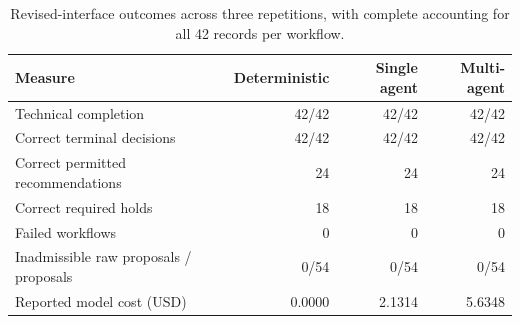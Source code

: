 \begin{table}[htbp]
\centering
\caption{Revised-interface outcomes across three repetitions, with complete accounting for all 42 records per workflow.}
\label{tab:narrative-interface}
\small
\begin{tabular*}{\textwidth}{@{\extracolsep{\fill}}lrrr@{}}
\toprule
Measure & Deterministic & Single agent & Multi-agent \\
\midrule
Technical completion & 42/42 & 42/42 & 42/42 \\
Correct terminal decisions & 42/42 & 42/42 & 42/42 \\
Correct permitted recommendations & 24 & 24 & 24 \\
Correct required holds & 18 & 18 & 18 \\
Failed workflows & 0 & 0 & 0 \\
Inadmissible raw proposals / proposals & 0/54 & 0/54 & 0/54 \\
Reported model cost (USD) & 0.0000 & 2.1314 & 5.6348 \\
\bottomrule
\end{tabular*}
\end{table}
